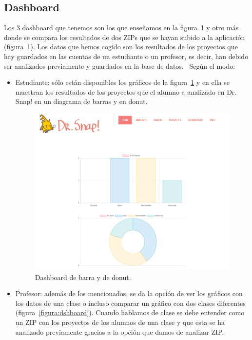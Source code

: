 \documentclass[a4paper, 12pt]{book}
\begin{document}
\subsection{Dashboard}
    Los 3 dashboard que tenemos son los que enseñamos en la figura~\ref{figura:dshboard2} y otro más donde se compara los resultados de dos ZIPs que se hayan subido a la aplicación (figura~\ref{figura:dshboard2}). Los datos que hemos cogido son los resultados de los proyectos que hay guardados en las cuentas de un estudiante o un profesor, es decir, han debido ser analizados previamente y guardados en la base de datos. ~Según el modo:
    \begin{itemize}
        \item Estudiante: sólo están disponibles los gráficos de la figura~\ref{figura:dshboard2} y en ella se muestran los resultados de los proyectos que el alumno a analizado en Dr. Snap! en un diagrama de barras y en donut.\\
        \begin{figure}[h]
            \centering
            \includegraphics[scale=0.4]{img/dashboard.PNG}
            \caption{Dashboard de barra y de donut.}
            \label{figura:dshboard2}
        \end{figure}
        \item Profesor: además de los mencionados, se da la opción de ver los gráficos con los datos de una clase o incluso comparar un gráfico con dos clases diferentes (figura~\ref{figura:dshboard}). Cuando hablamos de clase se debe entender como un ZIP con los proyectos de los alumnos de una clase y que esta se ha analizado previamente gracias a la opción que damos de analizar ZIP.

\end{itemize}
\end{document}
